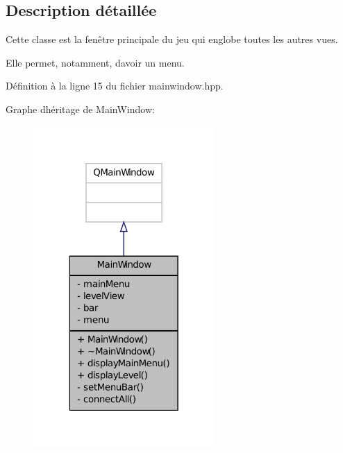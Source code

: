 \subsection{Description détaillée}
Cette classe est la fenêtre principale du jeu qui englobe toutes les autres vues. 

Elle permet, notamment, d\textquotesingle{}avoir un menu. 

Définition à la ligne 15 du fichier mainwindow.\+hpp.



Graphe d\textquotesingle{}héritage de Main\+Window\+:\nopagebreak
\begin{figure}[H]
\begin{center}
\leavevmode
\includegraphics[width=196pt]{d1/d96/classMainWindow__inherit__graph}
\end{center}
\end{figure}


